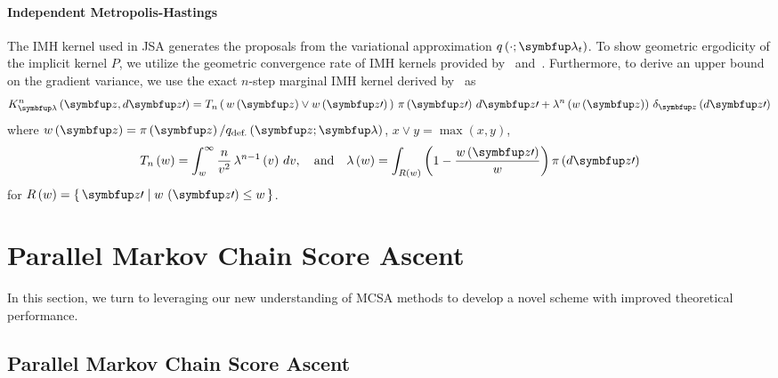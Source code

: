 \paragraph{Independent Metropolis-Hastings}
The IMH kernel used in JSA generates the proposals from the variational approximation \(q\left(\cdot; \vlambda_t\right)\).
To show geometric ergodicity of the implicit kernel \(P\), we utilize the geometric convergence rate of IMH kernels provided by~\citet[Theorem 2.1]{10.2307/2242610} and~\citet{wang_exact_2020}.
Furthermore, to derive an upper bound on the gradient variance, we use the exact \(n\)-step marginal IMH kernel derived by~\citet{Smith96exacttransition} as
{%
  \begin{align}
  K^n_{\vlambda}\left(\vz, d\vz\prime\right) 
  = T_n\left(\, w\left(\vz\right) \vee w\left(\vz\prime\right)\,\right) \, \pi\left(\vz\prime\right) \, d\vz\prime
  + \lambda^n\left(w\left(\vz\right)\right) \, \delta_{\vz}\left(d\vz\prime\right)
  \label{eq:imh_exact_kernel}
  \end{align}
}%
where {\(w\left(\vz\right) = \pi\left(\vz\right)/q_{\text{def.}}\left(\vz; \vlambda\right)\), \(x \vee y = \max\left(x, y\right)\)},
{\small
  \begin{align}
    T_n\left(w\right)      = \int_w^{\infty}
    \frac{n}{v^2}
    \, \lambda^{n-1}\left(v\right)\,dv,
    \quad\text{and}\quad
    \lambda\left(w\right) =
    \int_{R\left(w\right)}
    \left( 1 - \frac{w\left(\vz\prime\right)}{w}  \right)
    \pi\left(d\vz\prime\right)\label{eq:T_lambda}
  \end{align}
}
for {\(R\left(w\right) = \{\, \vz\prime \mid w\,\left(\vz\prime\right) \leq w \,\}\)}.
%


%

\section{Parallel Markov Chain Score Ascent}
In this section, we turn to leveraging our new understanding of MCSA methods to develop a novel scheme with improved theoretical performance.

\subsection{Parallel Markov Chain Score Ascent}

